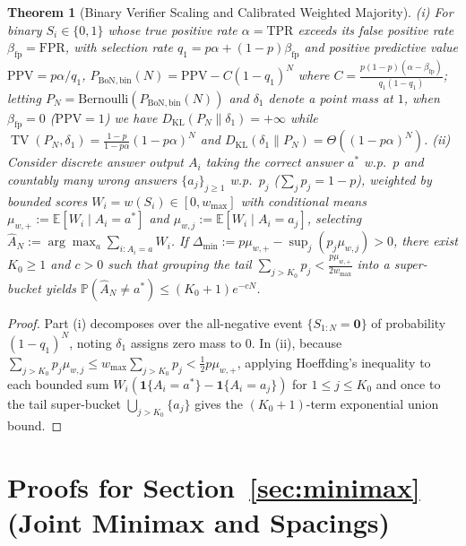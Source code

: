 \documentclass[10pt]{article}
\theoremstyle{plain}
\newtheorem{theorem}{Theorem}
\theoremstyle{definition}
\theoremstyle{remark}
\newcommand{\E}{\mathbb{E}}
\newcommand{\Prob}{\mathbb{P}}
\newcommand{\DKL}{D_{\mathrm{KL}}}
\newcommand{\TV}{\operatorname{TV}}
\newcommand{\ind}{\mathbf{1}}
\begin{document}
\begin{theorem}[Binary Verifier Scaling and Calibrated Weighted Majority]
\label{thm:app-cal}
(i) For binary $S_i \in \{0,1\}$ whose true positive rate $\alpha = \mathrm{TPR}$ exceeds its false positive rate $\beta_{\mathrm{fp}} = \mathrm{FPR}$, with selection rate $q_1 = p\alpha + (1-p)\beta_{\mathrm{fp}}$ and positive predictive value $\mathrm{PPV} = p\alpha/q_1$, $P_{\mathrm{BoN,bin}}(N) = \mathrm{PPV} - C(1-q_1)^N$ where $C = \frac{p(1-p)(\alpha-\beta_{\mathrm{fp}})}{q_1(1-q_1)}$; letting $P_N = \mathrm{Bernoulli}(P_{\mathrm{BoN,bin}}(N))$ and $\delta_1$ denote a point mass at $1$, when $\beta_{\mathrm{fp}} = 0$ ($\mathrm{PPV}=1$) we have $\DKL(P_N \| \delta_1) = +\infty$ while $\TV(P_N, \delta_1) = \frac{1-p}{1-p\alpha}(1-p\alpha)^N$ and $\DKL(\delta_1 \| P_N) = \Theta((1-p\alpha)^N)$. (ii) Consider discrete answer output $A_i$ taking the correct answer $a^*$ w.p.\ $p$ and countably many wrong answers $\{a_j\}_{j\ge 1}$ w.p.\ $p_j$ ($\sum_j p_j = 1-p$), weighted by bounded scores $W_i = w(S_i) \in [0, w_{\max}]$ with conditional means $\mu_{w,+} := \E[W_i \mid A_i=a^*]$ and $\mu_{w,j} := \E[W_i \mid A_i=a_j]$, selecting $\hat{A}_N := \arg\max_a \sum_{i: A_i = a} W_i$. If $\Delta_{\min} := p\mu_{w,+} - \sup_j(p_j\mu_{w,j}) > 0$, there exist $K_0 \ge 1$ and $c > 0$ such that grouping the tail $\sum_{j>K_0}p_j < \frac{p\mu_{w,+}}{2w_{\max}}$ into a super-bucket yields $\Prob(\hat{A}_N \neq a^*) \le (K_0+1)e^{-c N}$.
\end{theorem}
\begin{proof}
Part (i) decomposes over the all-negative event $\{S_{1:N} = \mathbf{0}\}$ of probability $(1-q_1)^N$, noting $\delta_1$ assigns zero mass to $0$. In (ii), because $\sum_{j>K_0} p_j \mu_{w,j} \le w_{\max}\sum_{j>K_0} p_j < \frac{1}{2}p\mu_{w,+}$, applying Hoeffding's inequality to each bounded sum $W_i(\ind\{A_i=a^*\} - \ind\{A_i=a_j\})$ for $1 \le j \le K_0$ and once to the tail super-bucket $\bigcup_{j>K_0}\{a_j\}$ gives the $(K_0+1)$-term exponential union bound.
\end{proof}

\section{Proofs for Section~\texorpdfstring{\ref{sec:minimax}}{4} (Joint Minimax and Spacings)}
\label{app:minimax}
\end{document}
